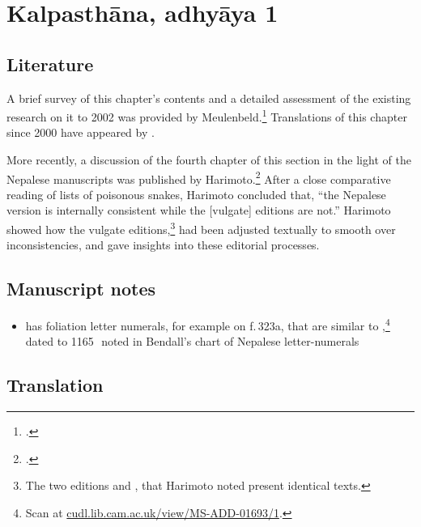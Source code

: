 \section{Kalpasthāna, adhyāya 1}

\subsection{Literature}

A brief survey of this chapter's contents and a detailed assessment of the
existing research on it to 2002 was provided by Meulenbeld.\footcite[IA,
289--290]{meul-hist} Translations of this chapter since 2000 have appeared by 
\textcites[131--139]{wuja-2003}[3, 1--15]{shar-susr}.

More recently, a discussion of the fourth chapter of this section in the light of
the Nepalese manuscripts was published by Harimoto.\footcite[101--104]{hari-2011}
After a close comparative reading of lists of poisonous snakes, Harimoto concluded
that, “the Nepalese version is internally consistent while the [vulgate] editions
are not.”  Harimoto showed how the vulgate editions,\footnote{The two editions
\cite{susr-trikamji3} and \cite{bhat-1889}, that Harimoto noted present identical
texts.} had been adjusted textually to smooth over inconsistencies, and gave
insights into these editorial processes.



\subsection{Manuscript notes}

\begin{itemize}
    \item {} has foliation letter numerals, for example on f.\,323a,
    that are similar to ,\footnote{Scan at 
    \href{https://cudl.lib.cam.ac.uk/view/MS-ADD-01693/1}{cudl.lib.cam.ac.uk/view/MS-ADD-01693/1}.}
     dated to 
    1165\,\CE\, noted in Bendall's 
    chart of Nepalese letter-numerals \cite[Lithograph V, after p.\,225]{bend-budd}
\end{itemize}

\newpage

\subsection{Translation}

